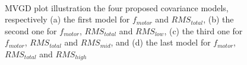 \documentclass[conference]{IEEEtran}
\begin{document}

\begin{figure} 
    \centering
    \hfill
    \\
    \hfill
  \caption{MVGD plot illustration the four proposed covariance models, respectively (a) the first model for $f_{motor}$ and $RMS_{total}$, (b) the second one for $f_{motor}$, $RMS_{total}$ and $RMS_{low}$, (c) the third one for $f_{motor}$, $RMS_{total}$ and $RMS_{mid}$, and (d) the last model for $f_{motor}$, $RMS_{total}$ and $RMS_{high}$}
  \label{fig_mvgd_plot} 
\end{figure}
\end{document}
